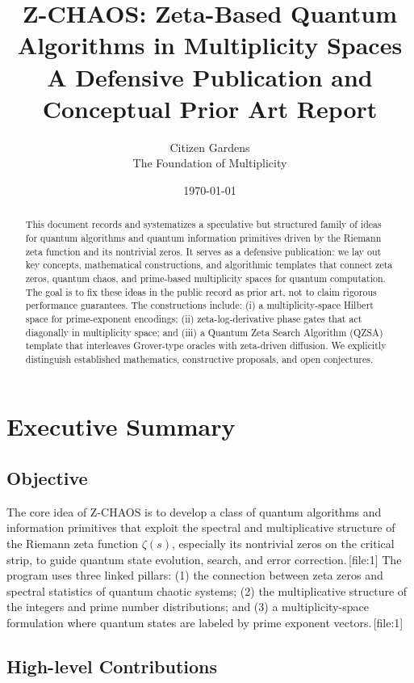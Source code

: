 \documentclass[11pt]{article}
\title{Z-CHAOS: Zeta-Based Quantum Algorithms in Multiplicity Spaces\\
\large A Defensive Publication and Conceptual Prior Art Report}
\author{Citizen Gardens \\ The Foundation of Multiplicity}
\date{\today}
\begin{document}
\maketitle

\begin{abstract}
This document records and systematizes a speculative but structured family of ideas for quantum algorithms and quantum information primitives driven by the Riemann zeta function and its nontrivial zeros. It serves as a defensive publication: we lay out key concepts, mathematical constructions, and algorithmic templates that connect zeta zeros, quantum chaos, and prime-based multiplicity spaces for quantum computation. The goal is to fix these ideas in the public record as prior art, not to claim rigorous performance guarantees. The constructions include: (i) a multiplicity-space Hilbert space for prime-exponent encodings; (ii) zeta-log-derivative phase gates that act diagonally in multiplicity space; and (iii) a Quantum Zeta Search Algorithm (QZSA) template that interleaves Grover-type oracles with zeta-driven diffusion. We explicitly distinguish established mathematics, constructive proposals, and open conjectures.
\end{abstract}
\newpage
\tableofcontents

\section{Executive Summary}
\label{sec:executive-summary}

\subsection{Objective}

The core idea of Z-CHAOS is to develop a class of quantum algorithms and information primitives that exploit the spectral and multiplicative structure of the Riemann zeta function \(\zeta(s)\), especially its nontrivial zeros on the critical strip, to guide quantum state evolution, search, and error correction.\,[file:1] The program uses three linked pillars: (1) the connection between zeta zeros and spectral statistics of quantum chaotic systems; (2) the multiplicative structure of the integers and prime number distributions; and (3) a multiplicity-space formulation where quantum states are labeled by prime exponent vectors.\,[file:1]

\subsection{High-level Contributions}
\end{document}

